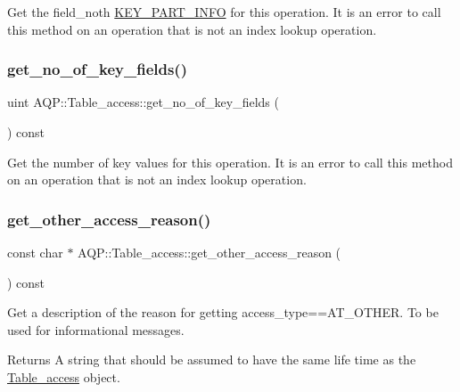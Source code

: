 Get the field\+\_\+no\textquotesingle{}th \mbox{\hyperlink{classKEY__PART__INFO}{K\+E\+Y\+\_\+\+P\+A\+R\+T\+\_\+\+I\+N\+FO}} for this operation. It is an error to call this method on an operation that is not an index lookup operation. \mbox{\label{classAQP_1_1Table__access_af85fb3397460129a42ddea12be9d3cc1}} 
\subsubsection{\texorpdfstring{get\+\_\+no\+\_\+of\+\_\+key\+\_\+fields()}{get\_no\_of\_key\_fields()}}
{\footnotesize\ttfamily uint A\+Q\+P\+::\+Table\+\_\+access\+::get\+\_\+no\+\_\+of\+\_\+key\+\_\+fields (\begin{DoxyParamCaption}{ }\end{DoxyParamCaption}) const}

Get the number of key values for this operation. It is an error to call this method on an operation that is not an index lookup operation. \mbox{\label{classAQP_1_1Table__access_af056c478a5e8b26a90114bb44af0c1a4}} 
\subsubsection{\texorpdfstring{get\+\_\+other\+\_\+access\+\_\+reason()}{get\_other\_access\_reason()}}
{\footnotesize\ttfamily const char $\ast$ A\+Q\+P\+::\+Table\+\_\+access\+::get\+\_\+other\+\_\+access\+\_\+reason (\begin{DoxyParamCaption}{ }\end{DoxyParamCaption}) const\hspace{0.3cm}{\ttfamily [inline]}}

Get a description of the reason for getting access\+\_\+type==A\+T\+\_\+\+O\+T\+H\+ER. To be used for informational messages. \begin{DoxyReturn}{Returns}
A string that should be assumed to have the same life time as the \mbox{\hyperlink{classAQP_1_1Table__access}{Table\+\_\+access}} object. 
\end{DoxyReturn}
\mbox{\label{classAQP_1_1Table__access_a1b4a0ca9060c584c52274371c2d7e479}} 
